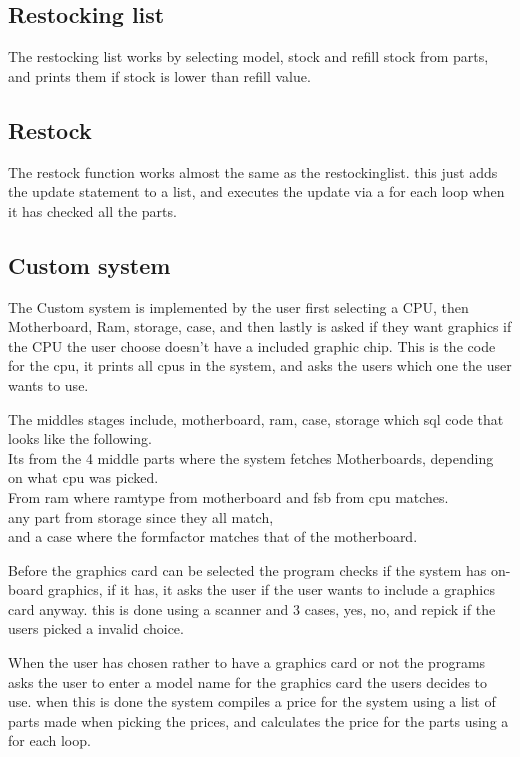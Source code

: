 \documentclass[a4paper,10pt,titlepage]{report}
\begin{document}
\subsection{Restocking list}
The restocking list works by selecting model, stock and refill stock from parts, and prints them if stock is lower than refill value.

\subsection{Restock}
The restock function works almost the same as the restockinglist. this just adds the update statement to a list, and executes the update via a for each loop when it has checked all the parts.

\subsection{Custom system}
The Custom system is implemented by the user first selecting a CPU, then Motherboard, Ram, storage, case, and then lastly is asked if they want graphics if the CPU the user choose doesn't have a included graphic chip.
This is the code for the cpu, it prints all cpus in the system, and asks the users which one the user wants to use. 

The middles stages include, motherboard, ram, case, storage which sql code that looks like the following. \\
Its from the 4 middle parts where the system fetches Motherboards, depending on what cpu was picked. \\
From ram where ramtype from motherboard and fsb from cpu matches.\\
any part from storage since they all match, \\
and a case where the formfactor matches that of the motherboard.

Before the graphics card can be selected the program checks if the system has on-board graphics, if it has, it asks the user if the user wants to include a graphics card anyway. this is done using a scanner and 3 cases, yes, no, and repick if the users picked a invalid choice. 

When the user has chosen rather to have a graphics card or not the programs asks the user to enter a model name for the graphics card the users decides to use.
when this is done the system compiles a price for the system using a list of parts made when picking the prices, and calculates the price for the parts using a for each loop.

\end{document}
